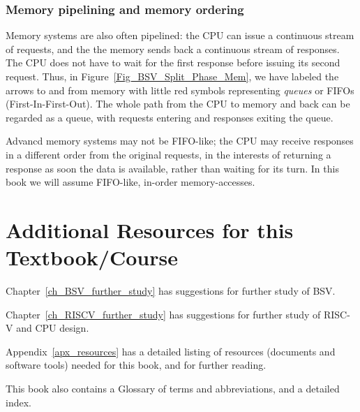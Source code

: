 \subsubsection{Memory pipelining and memory ordering}

Memory systems are also often pipelined: the CPU can issue a
continuous stream of requests, and the the memory sends back a
continuous stream of responses.  The CPU does not have to wait for the
first response before issuing its second request.  Thus, in
Figure~\ref{Fig_BSV_Split_Phase_Mem}, we have labeled the arrows to
and from memory with little red symbols representing \emph{queues} or
FIFOs (First-In-First-Out).  The whole path from the CPU to memory and
back can be regarded as a queue, with requests entering and responses
exiting the queue.

Advancd memory systems may not be FIFO-like; the CPU may receive
responses in a different order from the original requests, in the
interests of returning a response as soon the data is available,
rather than waiting for its turn.  In this book we will assume
FIFO-like, in-order memory-accesses.


\section{Additional Resources for this Textbook/Course}

Chapter~\ref{ch_BSV_further_study} has suggestions for further study
of BSV.

Chapter~\ref{ch_RISCV_further_study} has suggestions for further study
of RISC-V and CPU design.

Appendix~\ref{apx_resources} has a detailed listing of resources
(documents and software tools) needed for this book, and for further
reading.

This book also contains a Glossary of terms and abbreviations, and a
detailed index.

